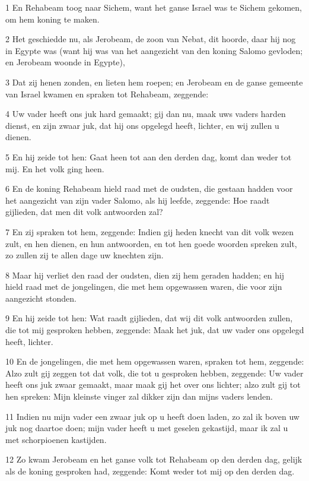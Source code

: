 \par 1 En Rehabeam toog naar Sichem, want het ganse Israel was te Sichem gekomen, om hem koning te maken.
\par 2 Het geschiedde nu, als Jerobeam, de zoon van Nebat, dit hoorde, daar hij nog in Egypte was (want hij was van het aangezicht van den koning Salomo gevloden; en Jerobeam woonde in Egypte),
\par 3 Dat zij henen zonden, en lieten hem roepen; en Jerobeam en de ganse gemeente van Israel kwamen en spraken tot Rehabeam, zeggende:
\par 4 Uw vader heeft ons juk hard gemaakt; gij dan nu, maak uws vaders harden dienst, en zijn zwaar juk, dat hij ons opgelegd heeft, lichter, en wij zullen u dienen.
\par 5 En hij zeide tot hen: Gaat heen tot aan den derden dag, komt dan weder tot mij. En het volk ging heen.
\par 6 En de koning Rehabeam hield raad met de oudsten, die gestaan hadden voor het aangezicht van zijn vader Salomo, als hij leefde, zeggende: Hoe raadt gijlieden, dat men dit volk antwoorden zal?
\par 7 En zij spraken tot hem, zeggende: Indien gij heden knecht van dit volk wezen zult, en hen dienen, en hun antwoorden, en tot hen goede woorden spreken zult, zo zullen zij te allen dage uw knechten zijn.
\par 8 Maar hij verliet den raad der oudsten, dien zij hem geraden hadden; en hij hield raad met de jongelingen, die met hem opgewassen waren, die voor zijn aangezicht stonden.
\par 9 En hij zeide tot hen: Wat raadt gijlieden, dat wij dit volk antwoorden zullen, die tot mij gesproken hebben, zeggende: Maak het juk, dat uw vader ons opgelegd heeft, lichter.
\par 10 En de jongelingen, die met hem opgewassen waren, spraken tot hem, zeggende: Alzo zult gij zeggen tot dat volk, die tot u gesproken hebben, zeggende: Uw vader heeft ons juk zwaar gemaakt, maar maak gij het over ons lichter; alzo zult gij tot hen spreken: Mijn kleinste vinger zal dikker zijn dan mijns vaders lenden.
\par 11 Indien nu mijn vader een zwaar juk op u heeft doen laden, zo zal ik boven uw juk nog daartoe doen; mijn vader heeft u met geselen gekastijd, maar ik zal u met schorpioenen kastijden.
\par 12 Zo kwam Jerobeam en het ganse volk tot Rehabeam op den derden dag, gelijk als de koning gesproken had, zeggende: Komt weder tot mij op den derden dag.
